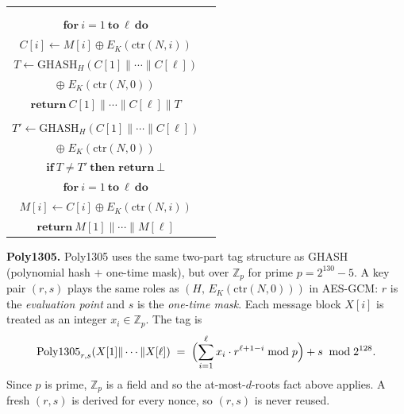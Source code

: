 \documentclass[11pt]{article}
\makeatletter
\newcommand{\calD}{{\cal D}}
\newcommand{\calE}{{\cal E}}
\newcommand{\gamesfontsize}{\small}
\newcommand{\hfpagess}[4]{
        \begin{tabular}{c@{\hspace*{.5em}}c}
        \framebox{\begin{minipage}[t]{#1\textwidth}\setstretch{1.2}\gamesfontsize #3 \end{minipage}}
        &
        \framebox{\begin{minipage}[t]{#2\textwidth}\setstretch{1.2}\gamesfontsize #4 \end{minipage}}
        \end{tabular}
    }
\newcommand{\GHASH}{\mathrm{GHASH}}
\newcommand{\Poly}{\mathrm{Poly1305}}
\newcommand{\ctr}{\mathrm{ctr}}
\makeatother
\begin{document}
{\hfuzz=3pt\begin{center}
\hfpagess{0.45}{0.49}{%
  \underline{\textbf{Alg} $\calE_K(N, M)$}\\
  \vspace*{-\topsep}
  \begin{tabbing}
  \hspace{0.8em}\=\hspace{1.2em}\=\kill
  \> $H \gets E_K(0^{128})$\\
  \> $\textbf{for}\ i = 1\ \textbf{to}\ \ell\ \textbf{do}$\\
  \>\> $C[i] \gets M[i] \oplus E_K(\ctr(N,i))$\\
  \> $T \gets \GHASH_H(C[1]\|\cdots\|C[\ell])$\\
  \> \phantom{$T \gets {}$}$\oplus\; E_K(\ctr(N,0))$\\
  \> $\textbf{return}\ C[1]\|\cdots\|C[\ell]\|T$
  \end{tabbing}
}{%
  \underline{\textbf{Alg} $\calD_K(N,\; C\|T)$}\\
  \vspace*{-\topsep}
  \begin{tabbing}
  \hspace{0.8em}\=\hspace{1.2em}\=\kill
  \> $H \gets E_K(0^{128})$\\
  \> $T' \gets \GHASH_H(C[1]\|\cdots\|C[\ell])$\\
  \> \phantom{$T' \gets {}$}$\oplus\; E_K(\ctr(N,0))$\\
  \> $\textbf{if}\ T \ne T'\ \textbf{then return}\ \bot$\\
  \> $\textbf{for}\ i = 1\ \textbf{to}\ \ell\ \textbf{do}$\\
  \>\> $M[i] \gets C[i] \oplus E_K(\ctr(N,i))$\\
  \> $\textbf{return}\ M[1]\|\cdots\|M[\ell]$
  \end{tabbing}
}
\end{center}}

\bigskip

\noindent\textbf{Poly1305.}\quad
Poly1305 uses the same two-part tag structure as GHASH
(polynomial hash $+$ one-time mask), but over $\mathbb{Z}_p$
for prime $p = 2^{130}-5$.
A key pair $(r, s)$ plays the same roles as $(H,\, E_K(\ctr(N,0)))$ in
AES-GCM: $r$ is the \emph{evaluation point} and $s$ is the
\emph{one-time mask}.
Each message block $X[i]$ is treated as an integer $x_i \in \mathbb{Z}_p$.
The tag is
\[
  \Poly_{r,s}(X[1]\|\cdots\|X[\ell])
  \;=\;
  \Bigl(\sum_{i=1}^{\ell} x_i \cdot r^{\ell+1-i} \bmod p\Bigr)
  + s \;\bmod 2^{128}.
\]
Since $p$ is prime, $\mathbb{Z}_p$ is a field and so the at-most-$d$-roots fact above applies.
A fresh $(r, s)$ is derived for every nonce, so $(r, s)$ is never reused.
\end{document}
